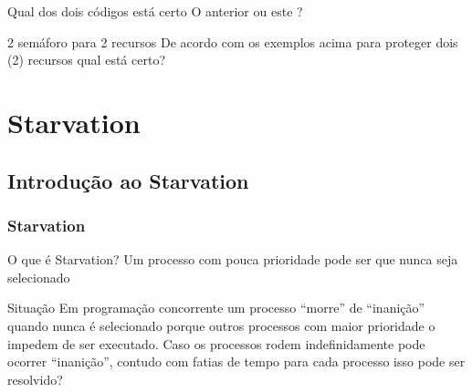 \documentclass[11pt]{beamer}
\begin{document}
\begin{frame}{ Qual dos dois códigos está certo}{ O anterior ou este ?}

\lstDsp

\pause

\begin{exampleblock}{2 semáforo para 2 recursos}
  De acordo com os exemplos acima para proteger dois (2) recursos qual está certo?
\end{exampleblock} 

\end{frame}


\section{ Starvation}
\subsection*{ Introdução ao Starvation}


\begin{frame}\frametitle{ Starvation }

\begin{block}{ O que é Starvation?}
 Um processo com pouca prioridade pode ser que nunca seja selecionado
\end{block}

\pause
\begin{exampleblock}{ Situação}
  Em programação concorrente um processo ``morre'' de ``inanição'' quando nunca é selecionado porque outros processos com maior prioridade o 
  impedem de ser executado.
  \pause
  Caso os processos rodem indefinidamente pode ocorrer ``inanição'', contudo com fatias de tempo para cada processo isso pode ser resolvido?

\end{exampleblock}

\end{frame}

\end{document}
